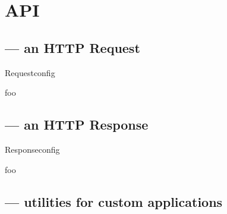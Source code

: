 \chapter{API}

\section{ --- an HTTP Request}

\begin{classdesc}{Request}{config}

foo
\end{classdesc}



\section{ --- an HTTP Response}

\begin{classdesc}{Response}{config}

foo
\end{classdesc}


\section{ --- utilities for custom applications}


